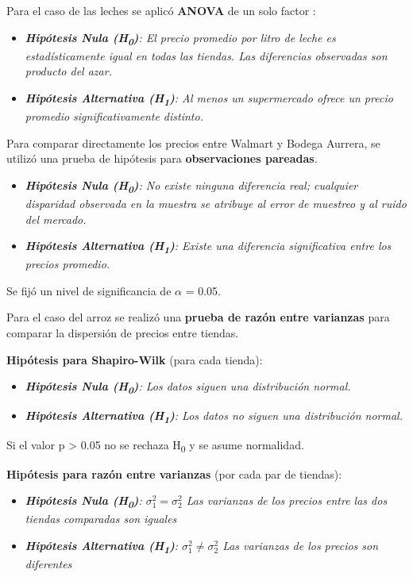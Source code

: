 \documentclass[aps, twocolumn, 11pt]{revtex4-2}
\begin{document}
Para el caso de las leches se aplicó \textbf{ANOVA} de un solo factor  \cite{walpole2012}:
\begin{itemize}
	\item \textit{\textbf{Hipótesis Nula (H\textsubscript{0})}: El precio promedio por litro de leche es estadísticamente igual en todas las tiendas. Las diferencias observadas son producto del azar.}
	\item \textit{\textbf{Hipótesis Alternativa (H\textsubscript{1})}:  Al menos un supermercado ofrece un precio promedio significativamente distinto.}	
\end{itemize}

Para comparar directamente los precios entre Walmart y Bodega Aurrera, se utilizó una prueba de hipótesis para \textbf{observaciones pareadas}.

\begin{itemize}
	\item \textit{\textbf{Hipótesis Nula (H\textsubscript{0})}: No existe ninguna diferencia real; cualquier disparidad observada en la muestra se atribuye al error de muestreo y al ruido del mercado.}
	\item \textit{\textbf{Hipótesis Alternativa (H\textsubscript{1})}:  Existe una diferencia significativa entre los precios promedio.}	
\end{itemize}
Se fijó un nivel de significancia de $\alpha$ = 0.05.

Para el caso del arroz se realizó una \textbf{prueba de razón entre varianzas} para comparar la dispersión de precios entre tiendas.

\textbf{Hipótesis para Shapiro-Wilk} (para cada tienda):
\begin{itemize}
	\item \textit{\textbf{Hipótesis Nula (H\textsubscript{0})}: Los datos siguen una distribución normal.}
	\item \textit{\textbf{Hipótesis Alternativa (H\textsubscript{1})}:  Los datos no siguen una distribución normal.}	
\end{itemize}
Si el valor p > 0.05 no se rechaza H\textsubscript{0} y se asume normalidad.

\textbf{Hipótesis para razón entre varianzas} (por cada par de tiendas):
\begin{itemize}
	\item \textit{\textbf{Hipótesis Nula (H\textsubscript{0})}: $\sigma_1^2 = \sigma_2^2$  Las varianzas de los precios entre las dos tiendas comparadas son iguales}
	\item \textit{\textbf{Hipótesis Alternativa (H\textsubscript{1})}: $\sigma_1^2 \neq \sigma_2^2$  Las varianzas de los precios son diferentes}	
\end{itemize}
\end{document}

